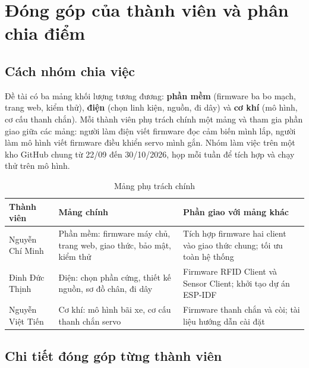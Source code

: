 \chapter{Đóng góp của thành viên và phân chia điểm}\label{chap:donggop}

\section{Cách nhóm chia việc}
Đề tài có ba mảng khối lượng tương đương: \textbf{phần mềm} (firmware ba bo mạch,
trang web, kiểm thử), \textbf{điện} (chọn linh kiện, nguồn, đi dây) và \textbf{cơ khí}
(mô hình, cơ cấu thanh chắn). Mỗi thành viên phụ trách chính một mảng và tham gia
phần giao giữa các mảng: người làm điện viết firmware đọc cảm biến mình lắp, người làm
mô hình viết firmware điều khiển servo mình gắn. Nhóm làm việc trên một kho GitHub
chung từ 22/09 đến 30/10/2026, họp mỗi tuần để tích hợp và chạy thử trên mô hình.

\begin{table}[H]
\centering\small
\caption{Mảng phụ trách chính}\label{tab:mang}
\begin{tabularx}{\linewidth}{@{}lXX@{}}
\toprule
\textbf{Thành viên} & \textbf{Mảng chính} & \textbf{Phần giao với mảng khác} \\ \midrule
Nguyễn Chí Minh & Phần mềm: firmware máy chủ, trang web, giao thức, bảo mật, kiểm thử & Tích hợp firmware hai client vào giao thức chung; tối ưu toàn hệ thống \\
Đinh Đức Thịnh & Điện: chọn phần cứng, thiết kế nguồn, sơ đồ chân, đi dây & Firmware RFID Client và Sensor Client; khởi tạo dự án ESP-IDF \\
Nguyễn Việt Tiến & Cơ khí: mô hình bãi xe, cơ cấu thanh chắn servo & Firmware thanh chắn và còi; tài liệu hướng dẫn cài đặt \\
\bottomrule
\end{tabularx}
\end{table}

\section{Chi tiết đóng góp từng thành viên}


